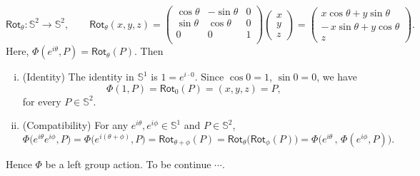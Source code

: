 \documentclass[11pt,openany]{article}
\begin{document}
\[
\mathsf{Rot}_\theta\colon \mathbb{S}^2\to \mathbb{S}^2,\qquad
\mathsf{Rot}_\theta(x,y,z)=
\begin{pmatrix}
	\cos\theta & -\sin\theta & 0 \\
	\sin\theta & \cos\theta & 0 \\
	0 & 0 & 1 \\
\end{pmatrix}
\begin{pmatrix}
	x \\ y\\ z
\end{pmatrix}
=\begin{pmatrix}
	x\cos\theta + y\sin\theta\\ -\,x\sin\theta + y\cos\theta\\ z
\end{pmatrix}.
\] Here, \(\Phi(e^{i\theta},P)=\mathsf{Rot}_\theta(P)\). Then \begin{enumerate}[(i)]
	\item (Identity) The identity in \(\mathbb{S}^1\) is \(1=e^{i\cdot0}\).  Since  
	\(\cos0=1\), \(\sin0=0\), we have \[
	\Phi(1,P)=\mathsf{Rot}_{0}(P)=(x,y,z)=P,
	\] for every \(P\in \mathbb{S}^2\).  
	\item (Compatibility) For any \(e^{i\theta},e^{i\phi}\in \mathbb{S}^1\) and \(P\in \mathbb{S}^2\),  
	\[
	\Phi\bigl(e^{i\theta}e^{i\phi},P\bigr)
	= \Phi\bigl(e^{i(\theta+\phi)},P\bigr)
	= \mathsf{Rot}_{\theta+\phi}(P)
	= \mathsf{Rot}_\theta\!\bigl(\mathsf{Rot}_\phi(P)\bigr)
	= \Phi\bigl(e^{i\theta}\,,\,\Phi(e^{i\phi},P)\bigr).
	\]
\end{enumerate}
Hence \(\Phi\) be a left group action. To be continue $\cdots$.

\end{document}
